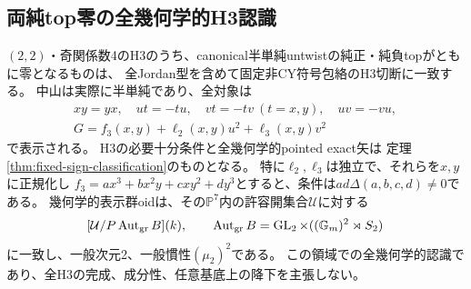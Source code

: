 \subsection{両純top零の全幾何学的H3認識}
\label{subsec:h3-order2-22-rank4-zero-top-classification}
\begin{theorem}\label{thm:h3-order2-22-rank4-zero-top-classification}
$(2,2)$・奇関係数4のH3のうち、canonical半単純untwistの純正・純負topがともに零となるものは、
全Jordan型を含めて固定非CY符号包絡のH3切断に一致する。
中山は実際に半単純であり、全対象は
\begin{gather*}
 xy=yx,\quad ut=-tu,\quad vt=-tv\ (t=x,y),\quad uv=-vu,\\
 G=f_3(x,y)+\ell_2(x,y)u^2+\ell_3(x,y)v^2
\end{gather*}
で表示される。
H3の必要十分条件と全幾何学的pointed exact矢は
定理\ref{thm:fixed-sign-classification}のものとなる。
特に$\ell_2,\ell_3$は独立で、それらを$x,y$に正規化し
$f_3=ax^3+bx^2y+cxy^2+dy^3$とすると、条件は$ad\Delta(a,b,c,d)\ne0$である。
幾何学的表示群oidは、その$\mathbb P^7$内の許容開集合$\mathcal U$に対する
\[
 [\mathcal U/P\operatorname{Aut}_{\rm gr}B](k),\qquad
 \operatorname{Aut}_{\rm gr}B=\operatorname{GL}_2\times
 ((\mathbb G_m)^2\rtimes S_2)
\]
に一致し、一般次元2、一般慣性$(\mu_2)^2$である。
この領域での全幾何学的認識であり、全H3の完成、成分性、任意基底上の降下を主張しない。
\end{theorem}
